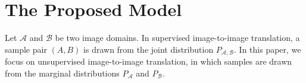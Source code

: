 \documentclass[conference]{IEEEtran}
\theoremstyle{definition}
\begin{document}
\section{The Proposed Model}
\label{sec-model}
Let $\mathcal A$ and $\mathcal B$ be two image domains. In supervised image-to-image translation, a sample pair $(A, B)$ is drawn from the joint distribution $P_{\mathcal A, \mathcal B}$. In this paper, we focus on unsupervised image-to-image translation, in which samples are drawn from the marginal distributions $P_{\mathcal A}$ and $P_{\mathcal B}$. 


%
%
\end{document}
